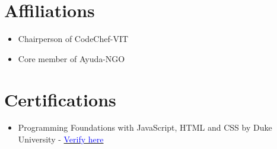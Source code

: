 \documentclass[a4paper,10pt]{article}
\begin{document}
\section*{Affiliations}
\begin{itemize}
    \item Chairperson of CodeChef-VIT
    \item Core member of Ayuda-NGO
\end{itemize}

\section*{Certifications}
\begin{itemize}
    \item Programming Foundations with JavaScript, HTML and CSS by Duke University - 
    \href{https://coursera.org/verify/ZZVTGPTSR36H}{\textcolor{blue}{Verify here}}
\end{itemize}
\end{document}
